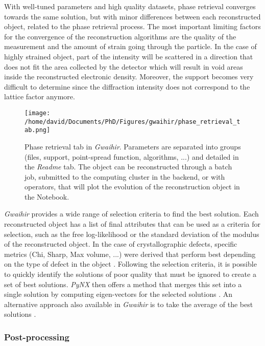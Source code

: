 With well-tuned parameters and high quality datasets, phase retrieval converges towards the same solution, but with minor differences between each reconstructed object, related to the phase retrieval process.
The most important limiting factors for the convergence of the reconstruction algorithms are the quality of the measurement and the amount of strain going through the particle.
In the case of highly strained object, part of the intensity will be scattered in a direction that does not fit the area collected by the detector which will result in void areas inside the reconstructed electronic density.
Moreover, the support becomes very difficult to determine since the diffraction intensity does not correspond to the lattice factor anymore.

\begin{figure}[!htb]
    \centering
    \texttt{[image: /home/david/Documents/PhD/Figures/gwaihir/phase\_retrieval\_tab.png]}
    \caption{
    Phase retrieval tab in \textit{Gwaihir}.
    Parameters are separated into groups (files, support, point-spread function, algorithms, ...) and detailed in the \textit{Readme} tab.
    The object can be reconstructed through a batch job, submitted to the computing cluster in the backend, or with operators, that will plot the evolution of the reconstruction object in the Notebook.
    }
    \label{fig:PRT}
\end{figure}

\textit{Gwaihir} provides a wide range of selection criteria to find the best solution.
Each reconstructed object has a list of final attributes that can be used as a criteria for selection, such as the free log-likelihood \parencite{pynx2020FLLK} or the standard deviation of the modulus of the reconstructed object.
In the case of crystallographic defects, specific metrics (Chi, Sharp, Max volume, ...) were derived that perform best depending on the type of defect in the object \parencite{Ulvestad2017}.
Following the selection criteria, it is possible to quickly identify the solutions of poor quality that must be ignored to create a set of best solutions.
\textit{PyNX} then offers a method that merges this set into a single solution by computing eigen-vectors for the selected solutions \parencite{pynx2020FLLK}.
An alternative approach also available in \textit{Gwaihir} is to take the average of the best solutions \parencite{ulvestad_nanoscale_2014}.

\subsubsection{Post-processing} \label{sec:postprocess}

